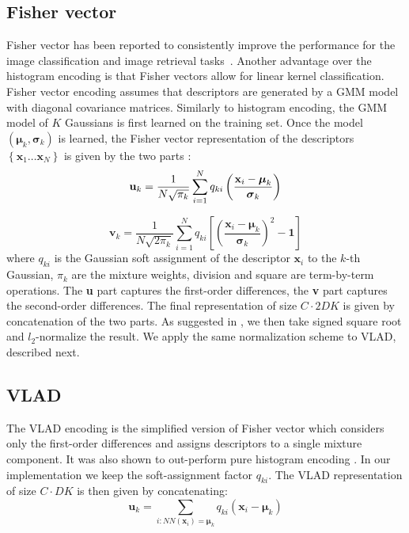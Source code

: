 \documentclass[10pt,twocolumn,letterpaper]{article}
\begin{document}
\subsection{Fisher vector}
\label{subsec:fvenc}
Fisher vector has been reported to consistently improve the performance for the image classification and image retrieval tasks~\cite{Jegou12}. Another advantage over the histogram encoding is that Fisher vectors allow for linear kernel classification. Fisher vector encoding assumes that descriptors are generated by a GMM model with diagonal covariance matrices. Similarly to histogram encoding, the GMM model of $K$ Gaussians is first learned on the training set. 
Once the model $\left(\boldsymbol\mu_k, \boldsymbol\sigma_k\right)$ is learned, the Fisher vector representation of the descriptors $\left\{\textbf{x}_1\dots \textbf{x}_N\right\}$ is given by the two parts \cite{Perronnin10}:
$${\textbf u}_k = \frac{1}{N\sqrt{\pi_k}}\sum_{i=1}^{N}q_{ki}\left(\frac{\textbf{x}_i-\boldsymbol\mu_k}{\boldsymbol\sigma_k}\right)$$

\begin{equation}
\label{eq:fv_vk}
\textbf{v}_k=\frac{1}{N\sqrt{2\pi_k}}\sum_{i=1}^{N}q_{ki}\left[\left(\frac{\textbf{x}_i-\boldsymbol\mu_k}{\boldsymbol\sigma_k}\right)^2-\textbf{1}\right]
\end{equation}
where $q_{ki}$ is the Gaussian soft assignment of the descriptor $\textbf{x}_i$ to the $k$-th Gaussian, $\pi_k$ are the mixture weights, division and square are term-by-term operations. The \textbf{u} part captures the first-order differences, the \textbf{v} part captures the second-order differences. The final representation of size $C\cdot 2DK$ is given by concatenation of the two parts. As suggested in \cite{Perronnin10}, we then take signed square root and $l_2$-normalize the result. We apply the same normalization scheme to VLAD, described next.
\subsection{VLAD}
\label{subsec:vladenc}
The VLAD encoding is the simplified version of Fisher vector which considers only the first-order differences and assigns descriptors to a single mixture component. It was also shown to out-perform pure histogram encoding \cite{Jegou12}. In our implementation we keep the soft-assignment factor $q_{ki}$. The VLAD representation of size $C\cdot DK$ is then given by concatenating:$$\textbf{u}_k=\sum_{i : NN\left(\textbf{x}_i\right)=\boldsymbol\mu_k}q_{ki}\left(\textbf{x}_i -\boldsymbol\mu_k\right)$$
\end{document}
